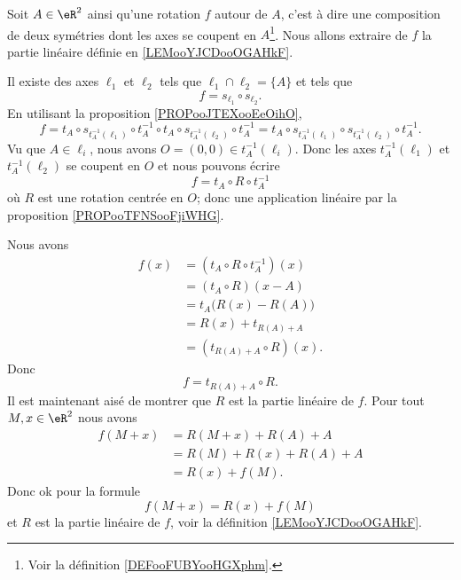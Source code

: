 \begin{example}
    Soit \( A\in \eR^2\) ainsi qu'une rotation \( f\) autour de \( A\), c'est à dire une composition de deux symétries dont les axes se coupent en \( A\)\footnote{Voir la définition \ref{DEFooFUBYooHGXphm}.}. Nous allons extraire de \( f\) la partie linéaire définie en \ref{LEMooYJCDooOGAHkF}.

    Il existe des axes \( \ell_1\) et \( \ell_2\) tels que \( \ell_1\cap\ell_2=\{ A \}\) et tels que
    \begin{equation}
        f=s_{\ell_1}\circ s_{\ell_2}.
    \end{equation}
    En utilisant la proposition \ref{PROPooJTEXooEeOihO},
    \begin{equation}
        f=t_A\circ s_{t^{-1}_A(\ell_1)}\circ t_A^{-1}\circ t_A\circ s_{t_A^{-1}(\ell_2)}\circ t_A^{-1}=t_A\circ s_{t^{-1}_A(\ell_1)}\circ s_{t_A^{-1}(\ell_2)}\circ t_A^{-1}.
    \end{equation}
    Vu que \( A\in\ell_i\), nous avons \( O=(0,0)\in t_A^{-1}(\ell_i)\). Donc les axes \( t_A^{-1}(\ell_1)\) et \( t_A^{-1}(\ell_2)\) se coupent en \( O\) et nous pouvons écrire
    \begin{equation}        %
        f=t_A\circ R\circ t_A^{-1}
    \end{equation}
    où \( R\) est une rotation centrée en \( O\); donc une application linéaire par la proposition \ref{PROPooTFNSooFjiWHG}.

    Nous avons
    \begin{subequations}
        \begin{align}
            f(x)&=(t_A\circ R\circ t_A^{-1})(x)\\
            &=(t_A\circ R)(x-A)\\
            &=t_A\big( R(x)-R(A) \big)\\
            &=R(x)+t_{R(A)+A}\\
            &=(t_{R(A)+A}\circ R)(x).
        \end{align}
    \end{subequations}
    Donc 
    \begin{equation}
        f=t_{R(A)+A}\circ R.
    \end{equation}
    Il est maintenant aisé de montrer que \( R\) est la partie linéaire de \( f\). Pour tout \( M,x\in \eR^2\) nous avons
    \begin{subequations}
        \begin{align}
            f(M+x)&=R(M+x)+R(A)+A\\
            &=R(M)+R(x)+R(A)+A\\
            &=R(x)+f(M).
        \end{align}
    \end{subequations}
    Donc ok pour la formule
    \begin{equation}
        f(M+x)=R(x)+f(M)
    \end{equation}
    et \( R\) est la partie linéaire de \( f\), voir la définition \ref{LEMooYJCDooOGAHkF}.
\end{example}

